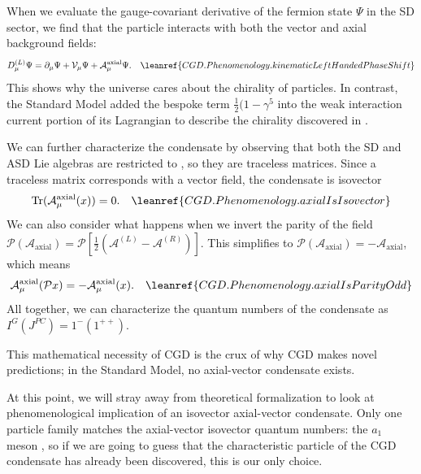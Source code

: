 When we evaluate the gauge-covariant derivative of the fermion state $\Psi$ in the SD sector, we find that the particle interacts with both the vector and axial background fields:
\begin{equation}
    D^{(L)}_\mu \Psi = \partial_\mu \Psi + \mathcal{V}_\mu \Psi + \mathcal{A}^{\text{axial}}_\mu \Psi .
    \quad \leanref{CGD.Phenomenology.kinematicLeftHandedPhaseShift}
    \label{eq:kinematicLeftHandedPhaseShift}
\end{equation}
\noindent This shows why the universe cares about the chirality of particles. In contrast, the Standard Model added the bespoke term $\frac{1}{2}(1 - \gamma^5$ \citep{feynman1958theory} into the weak interaction current portion of its Lagrangian to describe the chirality discovered in \citet{wu1957experimental}.

We can further characterize the condensate by observing that both the SD and ASD Lie algebras are restricted to \slTwoCAlg, so they are traceless matrices. Since a traceless matrix corresponds with a vector field, the condensate is isovector
\begin{equation}
    \mathrm{Tr}(\mathcal{A}^{\mathrm{axial}}_\mu(x)) = 0 .
    \quad \leanref{CGD.Phenomenology.axialIsIsovector}
    \label{eq:axialIsIsovector}
\end{equation}
\noindent We can also consider what happens when we invert the parity of the field $\mathcal{P}(\mathcal{A}_{\text{axial}}) = \mathcal{P}\left[ \frac{1}{2}(\mathcal{A}^{(L)} - \mathcal{A}^{(R)}) \right]$. This simplifies to $\mathcal{P}(\mathcal{A}_{\text{axial}}) = - \mathcal{A}_{\text{axial}}$, which means
\begin{equation}
    \mathcal{A}^{\mathrm{axial}}_\mu(\mathcal{P}x) = - \mathcal{A}^{\mathrm{axial}}_\mu(x).
    \quad \leanref{CGD.Phenomenology.axialIsParityOdd}
    \label{eq:axialIsParityOdd}
\end{equation}
\noindent All together, we can characterize the quantum numbers of the condensate as $I^G(J^{PC}) = 1^{-}(1^{++})$.

This mathematical necessity of CGD is the crux of why CGD makes novel predictions; in the Standard Model, no axial-vector condensate exists.

At this point, we will stray away from theoretical formalization to look at phenomenological implication of an isovector axial-vector condensate. Only one particle family matches the axial-vector isovector quantum numbers: the $a_1$ meson \citep{pdg2024}, so if we are going to guess that the characteristic particle of the CGD condensate has already been discovered, this is our only choice.

